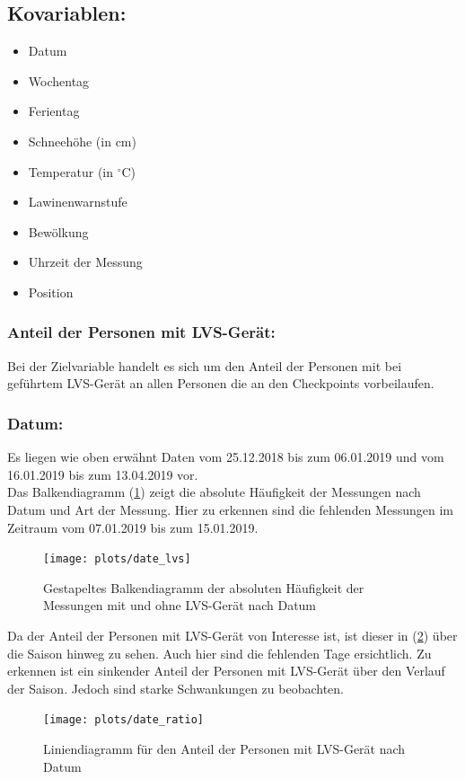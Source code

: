 \documentclass[12pt]{scrreprt}
\begin{document}
\subsection*{Kovariablen:}
\begin{itemize}
	\item Datum
	\item Wochentag
	\item Ferientag
	\item Schneehöhe (in cm)
	\item Temperatur (in $^\circ$C)
	\item Lawinenwarnstufe
	\item Bewölkung
	\item Uhrzeit der Messung
	\item Position
\end{itemize}

\newpage
\subsubsection*{Anteil der Personen mit LVS-Gerät:}
Bei der Zielvariable handelt es sich um den Anteil der Personen mit bei geführtem LVS-Gerät an allen Personen die an den Checkpoints vorbeilaufen.
\subsubsection*{Datum:}
Es liegen wie oben erwähnt Daten vom 25.12.2018 bis zum 06.01.2019 und vom 16.01.2019 bis zum 13.04.2019 vor. \\
Das Balkendiagramm (\ref{pic:date_lvs}) zeigt die absolute Häufigkeit der Messungen nach Datum und Art der Messung. Hier zu erkennen sind die fehlenden Messungen im Zeitraum vom 07.01.2019 bis zum 15.01.2019.
\begin{figure}[H]
	\centering
	\texttt{[image: plots/date\_lvs]}
	\caption{Gestapeltes Balkendiagramm der absoluten Häufigkeit der Messungen mit und ohne LVS-Gerät nach Datum}
	\label{pic:date_lvs}	
\end{figure}

\newpage
\noindent Da der Anteil der Personen mit LVS-Gerät von Interesse ist, ist dieser in (\ref{pic:date_ratio}) über die Saison hinweg zu sehen. Auch hier sind die fehlenden Tage ersichtlich. Zu erkennen ist ein sinkender Anteil der Personen mit LVS-Gerät über den Verlauf der Saison. Jedoch sind starke Schwankungen zu beobachten.
\begin{figure}[H]
	\centering
	\texttt{[image: plots/date\_ratio]}
	\caption{Liniendiagramm für den Anteil der Personen mit LVS-Gerät nach Datum}
	\label{pic:date_ratio}	
\end{figure}
\end{document}
